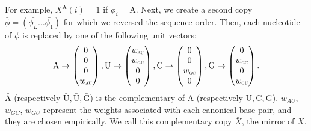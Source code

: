 For example, \(X^{\text{A}}(i) = 1\) if \(\phi_i = \text{A}\). Next, we create a second copy \(\bar{\phi}=(\bar{\phi_L}\dots \bar{\phi_1})\) for which we reversed the sequence order. Then, each nucleotide of \(\bar{\phi}\) is replaced by one of the following unit vectors:
\begin{equation}
\begin{split}
\bar{\text{A}} \rightarrow \begin{pmatrix} 0\\ 0\\ 0\\ w_{\scalebox{0.5}{AU}}\\ \end{pmatrix},
\bar{\text{U}} \rightarrow \begin{pmatrix} w_{\scalebox{0.5}{AU}}\\ w_{\scalebox{0.5}{GU}}\\ 0\\ 0\\ \end{pmatrix},
\bar{\text{C}} \rightarrow \begin{pmatrix} 0\\ 0\\ w_{\scalebox{0.5}{GC}}\\ 0\\ \end{pmatrix},
\bar{\text{G}} \rightarrow \begin{pmatrix} 0\\ w_{\scalebox{0.5}{GC}}\\ 0\\ w_{\scalebox{0.5}{GU}}\\ \end{pmatrix}.
\end{split}
\end{equation}
\(\bar{\text{A}}\) (respectively \(\bar{\text{U}}, \bar{\text{U}}, \bar{\text{G}}\)) is the complementary of \(\text{A}\) (respectively \(\text{U}, \text{C}, \text{G}\)). \(w_{AU}\), \(w_{GC}\), \(w_{GU}\) represent the weights associated with each canonical base pair, and they are chosen empirically. We call this complementary copy \(\bar{X}\), the mirror of \(X\).

